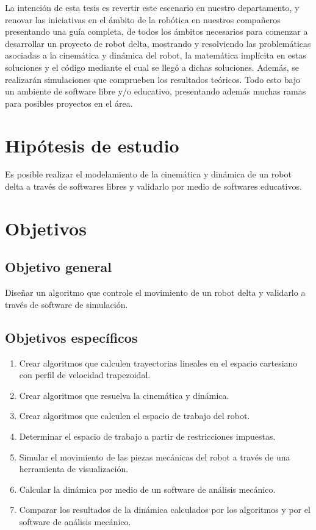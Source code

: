 La intención de esta tesis es revertir este escenario en nuestro departamento, y renovar las iniciativas en el ámbito de la robótica en nuestros compañeros presentando una guía completa, de todos los ámbitos necesarios para comenzar a desarrollar un proyecto de robot delta, mostrando y resolviendo las problemáticas asociadas a la cinemática y dinámica del robot, la matemática implícita en estas soluciones y el código mediante el cual se llegó a dichas soluciones. Además, se realizarán simulaciones que comprueben los resultados teóricos. Todo esto bajo un ambiente de software libre y/o educativo, presentando además muchas ramas para posibles proyectos en el área.

\section{Hipótesis de estudio}
Es posible realizar el modelamiento de la cinemática y dinámica de un robot delta a través de softwares libres y validarlo por medio de softwares educativos.

\section{Objetivos}

    \subsection{Objetivo general}
    Diseñar un algoritmo que controle el movimiento de un robot delta y validarlo a través de software de simulación.

\subsection{Objetivos específicos}
\begin{enumerate}
    \item {Crear algoritmos que calculen trayectorias lineales en el espacio cartesiano con perfil de velocidad trapezoidal.}
    \item {Crear algoritmos que resuelva la cinemática y dinámica.}
    \item {Crear algoritmos que calculen el espacio de trabajo del robot.}
    \item {Determinar el espacio de trabajo a partir de restricciones impuestas.}
    \item {Simular el movimiento de las piezas mecánicas del robot a través de una herramienta de visualización.}
    \item {Calcular la dinámica por medio de un software de análisis mecánico.}
    \item {Comparar los resultados de la dinámica calculados por los algoritmos y por el software de análisis mecánico. }
\end{enumerate}

